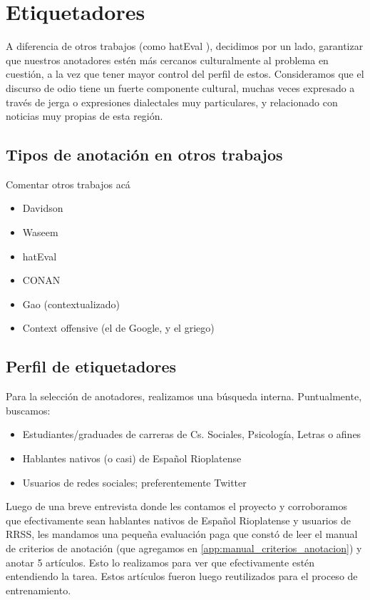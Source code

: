 \section{Etiquetadores}

A diferencia de otros trabajos (como hatEval \cite{hateval2019semeval}), decidimos por un lado, garantizar que nuestros anotadores estén más cercanos culturalmente al problema en cuestión, a la vez que tener mayor control del perfil de estos. Consideramos que el discurso de odio tiene un fuerte componente cultural, muchas veces expresado a través de jerga o expresiones dialectales muy particulares, y relacionado con noticias muy propias de esta región.


\subsection{Tipos de anotación en otros trabajos}

Comentar otros trabajos acá

\begin{itemize}
    \item Davidson
    \item Waseem
    \item hatEval
    \item CONAN
    \item Gao (contextualizado)
    \item Context offensive (el de Google, y el griego)
\end{itemize}

\subsection{Perfil de etiquetadores}

Para la selección de anotadores, realizamos una búsqueda interna. Puntualmente, buscamos:

\begin{itemize}
    \item Estudiantes/graduades de carreras de Cs. Sociales, Psicología, Letras o afines
    \item Hablantes nativos (o casi) de Español Rioplatense
    \item Usuarios de redes sociales; preferentemente Twitter
\end{itemize}

Luego de una breve entrevista donde les contamos el proyecto y corroboramos que efectivamente sean hablantes nativos de Español Rioplatense y usuarios de RRSS, les mandamos una pequeña evaluación paga que constó de leer el manual de criterios de anotación (que agregamos en \ref{app:manual_criterios_anotacion}) y anotar 5 artículos. Esto lo realizamos para ver que efectivamente estén entendiendo la tarea. Estos artículos fueron luego reutilizados para el proceso de entrenamiento.

